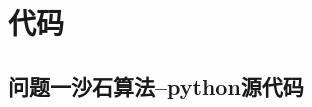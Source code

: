 \documentclass{whutmod}
\begin{document}
	\newpage
	\appendix %

\section{代码}
\subsection{问题一沙石算法--python源代码}
\begin{lstlisting}[language=python]

\end{lstlisting}
\end{document}
